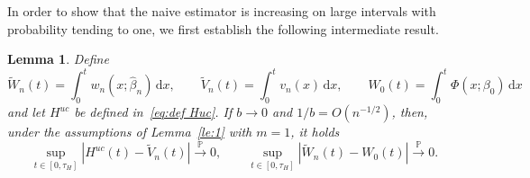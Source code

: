 \documentclass[11pt,reqno]{amsart}
\theoremstyle{definition}
\theoremstyle{plain}
\newtheorem{lemma}[de]{Lemma}
\theoremstyle{remark}
\begin{document}
In order to show that the naive estimator is increasing on large intervals with probability tending to one,
we first establish the following intermediate result.
\begin{lemma}
\label{le:2}
Define
\begin{equation}
\label{eqn:W_n}
\tilde W_n(t)=\int_0^t w_n(x;\hat{\beta}_n)\,\mathrm{d}x,
\qquad
\tilde V_n(t)=\int_0^t v_n(x)\,\mathrm{d}x,
\qquad
W_0(t)=\int_0^t \Phi(x;\beta_0)\,\mathrm{d}x
\end{equation}
and let $H^{uc}$ be defined in~\eqref{eq:def Huc}.
If $b\to0$ and $1/b=O(n^{-1/2})$, then, under the assumptions of Lemma~\ref{le:1} with $m=1$, it holds
\begin{equation}
\label{eqn:lemma2}
\sup_{t\in[0,\tau_H]}
\left|H^{uc}(t)-\tilde V_n(t)\right|\xrightarrow{\mathbb{P}}0,
\qquad
\sup_{t\in[0,\tau_H]}
\left|\tilde W_n(t)-W_0(t)
\right|\xrightarrow{\mathbb{P}}0.
\end{equation}
\end{lemma}
\end{document}

